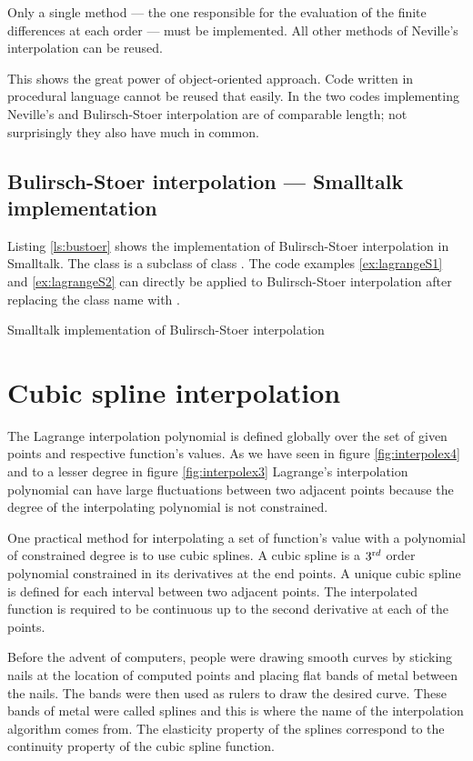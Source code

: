 Only a single method --- the one responsible for the evaluation of
the finite differences at each order --- must be implemented. All
other methods of Neville's interpolation can be reused.

This shows the great power of object-oriented approach. Code
written in procedural language cannot be reused that easily. In
\cite{Press} the two codes implementing Neville's and
Bulirsch-Stoer interpolation are of comparable length; not
surprisingly they also have much in common.

\subsection{Bulirsch-Stoer interpolation --- Smalltalk implementation}
Listing \ref{ls:bustoer} shows the implementation of
Bulirsch-Stoer interpolation in Smalltalk. The class  is a subclass of class . The code examples \ref{ex:lagrangeS1} and
\ref{ex:lagrangeS2} can directly be applied to Bulirsch-Stoer
interpolation after replacing the class name  with .
\begin{listing}
  Smalltalk implementation of Bulirsch-Stoer interpolation
\label{ls:bustoer}

\end{listing}


\section{Cubic spline interpolation}
The Lagrange interpolation polynomial is defined globally over the
set of given points and respective function's values. As we have
seen in figure \ref{fig:interpolex4} and to a lesser degree in
figure \ref{fig:interpolex3} Lagrange's interpolation polynomial
can have large fluctuations between two adjacent points because
the degree of the interpolating polynomial is not constrained.

One practical method for interpolating a set of function's value
with a polynomial of constrained degree is to use cubic splines. A
cubic spline is a $3^{\mathop{\textrm rd}}$ order polynomial
constrained in its derivatives at the end points. A unique cubic
spline is defined for each interval between two adjacent points.
The interpolated function is required to be continuous up to the
second derivative at each of the points.

Before the advent of computers, people were drawing smooth curves
by sticking nails at the location of computed points and placing
flat bands of metal between the nails. The bands were then used as
rulers to draw the desired curve. These bands of metal were called
splines and this is where the name of the interpolation algorithm
comes from. The elasticity property of the splines correspond to
the continuity property of the cubic spline function.

